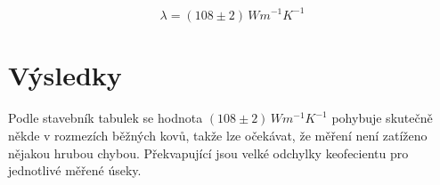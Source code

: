 \documentclass[a4paper,11pt]{article}
\begin{document}
    $$\lambda = \left(108 \pm 2\right) \, W m^{-1} K^{-1}$$

\section{Výsledky}

    \paragraph{} Podle stavebník tabulek se hodnota $\left(108 \pm 2\right) \, W m^{-1} K^{-1}$
    pohybuje skutečně někde v rozmezích běžných kovů, takže lze očekávat, že měření není
    zatíženo nějakou hrubou chybou. Překvapující jsou velké odchylky keofecientu pro jednotlivé 
    měřené úseky.
\end{document}
